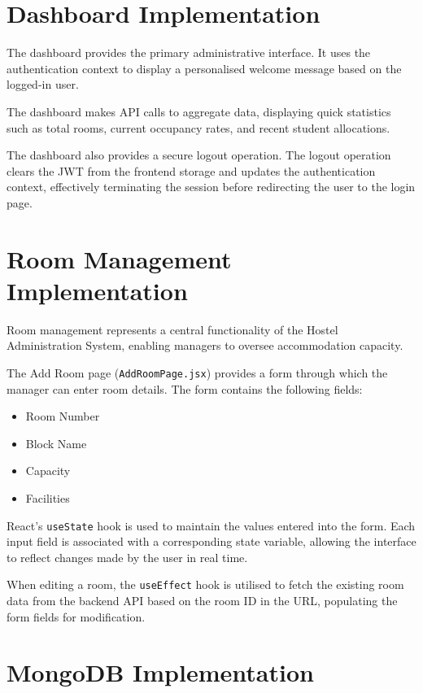 \section{Dashboard Implementation}

The dashboard provides the primary administrative interface. It uses the authentication context to display a personalised welcome message based on the logged-in user.

The dashboard makes API calls to aggregate data, displaying quick statistics such as total rooms, current occupancy rates, and recent student allocations.

The dashboard also provides a secure logout operation. The logout operation clears the JWT from the frontend storage and updates the authentication context, effectively terminating the session before redirecting the user to the login page.

\section{Room Management Implementation}

Room management represents a central functionality of the Hostel Administration System, enabling managers to oversee accommodation capacity.

The Add Room page (\texttt{AddRoomPage.jsx}) provides a form through which the manager can enter room details. The form contains the following fields:

\begin{itemize}
    \item Room Number
    \item Block Name
    \item Capacity
    \item Facilities
\end{itemize}

React's \texttt{useState} hook is used to maintain the values entered into the form. Each input field is associated with a corresponding state variable, allowing the interface to reflect changes made by the user in real time.

When editing a room, the \texttt{useEffect} hook is utilised to fetch the existing room data from the backend API based on the room ID in the URL, populating the form fields for modification.

\section{MongoDB Implementation}

